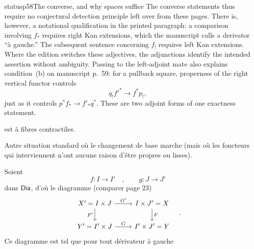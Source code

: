 \begin{dcomment}{status}{p58}{The converse, and why spaces suffice}
The converse statements thus require no conjectural detection principle left over from these pages. There is, however, a notational qualification in the printed paragraph: a comparison involving $f_*$ requires right Kan extensions, which the manuscript calls a derivator ``\`a gauche.'' The subsequent sentence concerning $f_!$ requires left Kan extensions. Where the edition switches these adjectives, the adjunctions identify the intended assertion without ambiguity. Passing to the left-adjoint mate also explains condition~(b) on manuscript p.~59: for a pullback square, properness of the right vertical functor controls
\[
 q_!f'^*\longrightarrow f^*p_!,
\]
just as it controls $p^*f_*\to f'_*q^*$. These are two adjoint forms of one exactness statement.
\end{dcomment}


\noindent est à fibres contractiles.

Autre situation standard où le changement de base marche (mais où les foncteurs qui interviennent n'ont aucune raison d'être propres ou lisses).

Soient
\[
f : I \longrightarrow I' \quad , \qquad g : J \longrightarrow J'
\]
dans $\mathsf{Dia}$, d'où le diagramme (comparer page 23)
\[
\begin{tikzcd}
X' = I \times J \arrow[r, "G'"] \arrow[d, "F'"'] & I \times J' = X \arrow[d, "F"] \\
Y' = I' \times J \arrow[r, "G"] & I' \times J' = Y
\end{tikzcd}
\quad .
\]
Ce diagramme est tel que pour tout dérivateur à gauche

\noindent{}

